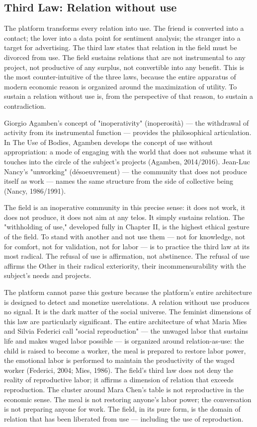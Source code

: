 \subsection{Third Law: Relation without use}

The platform transforms every relation into use. The friend is converted into a contact; the lover into a data point for sentiment analysis; the stranger into a target for advertising. The third law states that relation in the field must be divorced from use. The field sustains relations that are not instrumental to any project, not productive of any surplus, not convertible into any benefit. This is the most counter-intuitive of the three laws, because the entire apparatus of modern economic reason is organized around the maximization of utility. To sustain a relation without use is, from the perspective of that reason, to sustain a contradiction.

Giorgio Agamben's concept of "inoperativity" (inoperosità) — the withdrawal of activity from its instrumental function — provides the philosophical articulation. In The Use of Bodies, Agamben develops the concept of use without appropriation: a mode of engaging with the world that does not subsume what it touches into the circle of the subject's projects (Agamben, 2014/2016). Jean-Luc Nancy's "unworking" (désoeuvrement) — the community that does not produce itself as work — names the same structure from the side of collective being (Nancy, 1986/1991).

The field is an inoperative community in this precise sense: it does not work, it does not produce, it does not aim at any telos. It simply sustains relation. The "withholding of use," developed fully in Chapter II, is the highest ethical gesture of the field. To stand with another and not use them — not for knowledge, not for comfort, not for validation, not for labor — is to practice the third law at its most radical. The refusal of use is affirmation, not abstinence. The refusal of use affirms the Other in their radical exteriority, their incommensurability with the subject's needs and projects.

The platform cannot parse this gesture because the platform's entire architecture is designed to detect and monetize userelations. A relation without use produces no signal. It is the dark matter of the social universe. The feminist dimensions of this law are particularly significant. The entire architecture of what Maria Mies and Silvia Federici call "social reproduction" — the unwaged labor that sustains life and makes waged labor possible — is organized around relation-as-use: the child is raised to become a worker, the meal is prepared to restore labor power, the emotional labor is performed to maintain the productivity of the waged worker (Federici, 2004; Mies, 1986). The field's third law does not deny the reality of reproductive labor; it affirms a dimension of relation that exceeds reproduction. The cluster around Mara Chen's table is not reproductive in the economic sense. The meal is not restoring anyone's labor power; the conversation is not preparing anyone for work. The field, in its pure form, is the domain of relation that has been liberated from use — including the use of reproduction.

